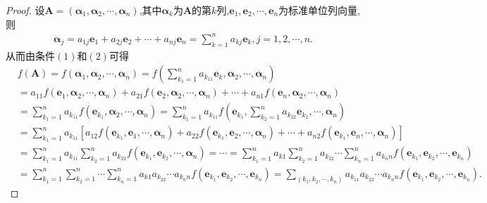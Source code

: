 \documentclass[../../main.tex]{subfiles}%
\begin{document}
\begin{proof}

设\(\boldsymbol{A} = (\boldsymbol{\alpha}_1,\boldsymbol{\alpha}_2,\cdots,\boldsymbol{\alpha}_n)\),其中\(\boldsymbol{\alpha}_k\)为\(\boldsymbol{A}\)的第\(k\)列,\(\boldsymbol{e}_1,\boldsymbol{e}_2,\cdots,\boldsymbol{e}_n\)为标准单位列向量,则
\begin{align*}
\boldsymbol{\alpha}_j = a_{1j}\boldsymbol{e}_1 + a_{2j}\boldsymbol{e}_2 + \cdots + a_{nj}\boldsymbol{e}_n = \sum_{k = 1}^{n}a_{kj}\boldsymbol{e}_k,j = 1,2,\cdots,n.
\end{align*}
从而由条件\((1)\)和\((2)\)可得
\begin{align*}
&f\left( \boldsymbol{A} \right) =f\left( \boldsymbol{\alpha }_1,\boldsymbol{\alpha }_2,\cdots ,\boldsymbol{\alpha }_n \right) =f\left( \sum_{k_1=1}^n{a_{k_11}\boldsymbol{e}_k},\boldsymbol{\alpha }_2,\cdots ,\boldsymbol{\alpha }_n \right) 
\\
&=a_{11}f\left( \boldsymbol{e}_1,\boldsymbol{\alpha }_2,\cdots ,\boldsymbol{\alpha }_n \right) +a_{21}f\left( \boldsymbol{e}_2,\boldsymbol{\alpha }_2,\cdots ,\boldsymbol{\alpha }_n \right) +\cdots +a_{n1}f\left( \boldsymbol{e}_n,\boldsymbol{\alpha }_2,\cdots ,\boldsymbol{\alpha }_n \right) 
\\
&=\sum_{k_1=1}^n{a_{k_11}f\left( \boldsymbol{e}_{k_1},\boldsymbol{\alpha }_2,\cdots ,\boldsymbol{\alpha }_n \right)}=\sum_{k_1=1}^n{a_{k_11}f\left( \boldsymbol{e}_{k_1},\sum_{k_2=1}^n{a_{k_22}\boldsymbol{e}_{k_2}},\cdots ,\boldsymbol{\alpha }_n \right)}
\\
&=\sum_{k_1=1}^n{a_{k_11}\left[ a_{12}f\left( \boldsymbol{e}_{k_1},\boldsymbol{e}_1,\cdots ,\boldsymbol{\alpha }_n \right) +a_{22}f\left( \boldsymbol{e}_{k_1},\boldsymbol{e}_2,\cdots ,\boldsymbol{\alpha }_n \right) +\cdots +a_{n2}f\left( \boldsymbol{e}_{k_1},\boldsymbol{e}_n,\cdots ,\boldsymbol{\alpha }_n \right) \right]}
\\
&=\sum_{k_1=1}^n{a_{k_11}\sum_{k_2=1}^n{a_{k_22}}f\left( \boldsymbol{e}_{k_1},\boldsymbol{e}_{k_2},\cdots ,\boldsymbol{\alpha }_n \right)}=\cdots =\sum_{k_1=1}^n{a_{k1}\sum_{k_2=1}^n{a_{k_22}}\cdots \sum_{k_n=1}^n{a_{k_nn}f\left( \boldsymbol{e}_{k_1},\boldsymbol{e}_{k_2},\cdots ,\boldsymbol{e}_{k_n} \right)}}
\\
&=\sum_{k_1=1}^n{\sum_{k_2=1}^n{\cdots \sum_{k_n=1}^n{a_{k1}a_{k_22}\cdots a_{k_nn}f\left( \boldsymbol{e}_{k_1},\boldsymbol{e}_{k_2},\cdots ,\boldsymbol{e}_{k_n} \right)}}}=\sum_{\left( k_1,k_2,\cdots ,k_n \right)}{a_{k_11}a_{k_22}\cdots a_{k_nn}f\left( \boldsymbol{e}_{k_1},\boldsymbol{e}_{k_2},\cdots ,\boldsymbol{e}_{k_n} \right)}.

\end{align*}
\end{proof}
\end{document}
